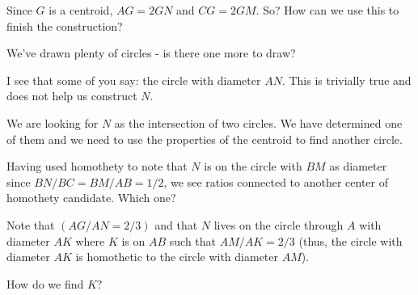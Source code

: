 






Since $G$ is a centroid, $AG = 2GN$ and $CG = 2GM.$ So?  How can we use this to finish the construction?

We've drawn plenty of circles - is there one more to draw?

I see that some of you say: the circle with diameter $AN$. This is trivially true and does not help us construct $N$.

We are looking for $N$ as the intersection of two circles. We have determined one of them and we need to use the properties of the centroid to find another circle.

Having used homothety to note that $N$ is on the circle with $BM$ as diameter since $BN/BC = BM/AB = 1/2$, we see ratios connected to another center of homothety candidate. Which one?

Note that $(AG/AN = 2/3)$ and that $N$ lives on the circle through $A$ with diameter $AK$ where $K$ is on $AB$ such that $AM/AK = 2/3$ (thus, the circle with diameter $AK$ is homothetic to the circle with diameter $AM$).

How do we find $K?$



